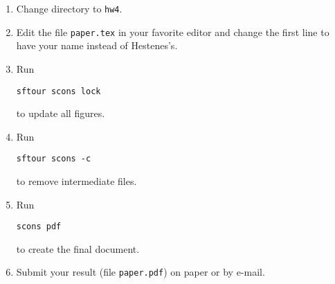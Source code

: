 \begin{enumerate}
\item Change directory to \texttt{hw4}.
\item Edit the file \texttt{paper.tex} in your favorite editor and change the
  first line to have your name instead of Hestenes's.
\item Run
\begin{verbatim}
sftour scons lock
\end{verbatim}
to update all figures.
\item Run
\begin{verbatim}
sftour scons -c
\end{verbatim}
to remove intermediate files.
\item Run
\begin{verbatim}
scons pdf
\end{verbatim}
to create the final document.
\item Submit your result (file \texttt{paper.pdf}) on paper or by
e-mail.
\end{enumerate}




